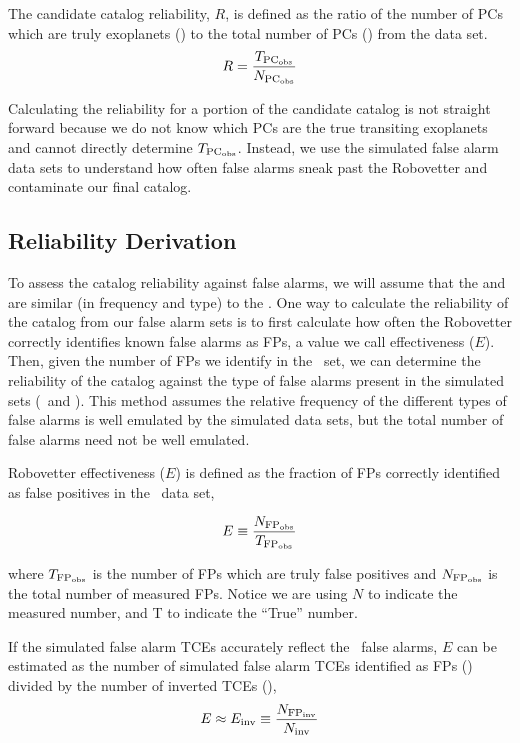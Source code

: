 The candidate catalog reliability, $R$, is defined as the ratio of the number of PCs which are truly exoplanets (\trueopspc) to the total number of PCs (\opspc) from the \opstce{} data set. 
\begin{equation}
\label{eq:rel}
R = \frac{T_{\rm PC_{\rm obs}}}{N_{\rm PC_{\rm obs}}}
\end{equation}

Calculating the reliability for a portion of the candidate catalog is not straight forward because we do not know which PCs are the true transiting exoplanets and cannot directly determine $T_{\rm PC_{\rm obs}}$. Instead, we use the simulated false alarm data sets to understand how often false alarms sneak past the Robovetter and contaminate our final catalog.


\subsection{Reliability Derivation}
\label{s:relcalc}
To assess the catalog reliability against false alarms, we will assume that the  and  are similar (in frequency and type) to the \opstces.  One way to calculate the reliability of the catalog from our false alarm sets is to first calculate how often the Robovetter correctly identifies known false alarms as FPs, a value we call effectiveness ($E$).  Then, given the number of FPs we identify in the \opstce\ set, we can determine the reliability of the catalog against the type of false alarms present in the simulated sets (\invtces\ and \scrtces). This method assumes the relative frequency of the different types of false alarms is well emulated by the simulated data sets, but the total number of false alarms need not be well emulated.


Robovetter effectiveness ($E$) is defined as the fraction of FPs correctly identified as false positives in the \opstce\ data set,

\begin{equation}
\label{effect1}
E \equiv \frac{N_{\rm FP_{\rm obs}}}{T_{\rm FP_{\rm obs}}}
\end{equation}

\noindent where $T_{\rm FP_{\rm obs}}$ is the number of FPs which are truly false positives and $N_{\rm FP_{\rm obs}}$ is the total number of measured FPs. Notice we are using $N$ to indicate the measured number, and T to indicate the ``True'' number. 

If the simulated false alarm TCEs accurately reflect the \opstce\ false alarms, $E$ can be estimated as the number of simulated false alarm TCEs identified as FPs (\invfp) divided by the number of inverted TCEs (\invN), 
\begin{equation}
\label{effect2}
E \approx E_{\rm inv} \equiv \frac{N_{\rm FP_{\rm inv}}}{N_{\rm inv}}
\end{equation}


